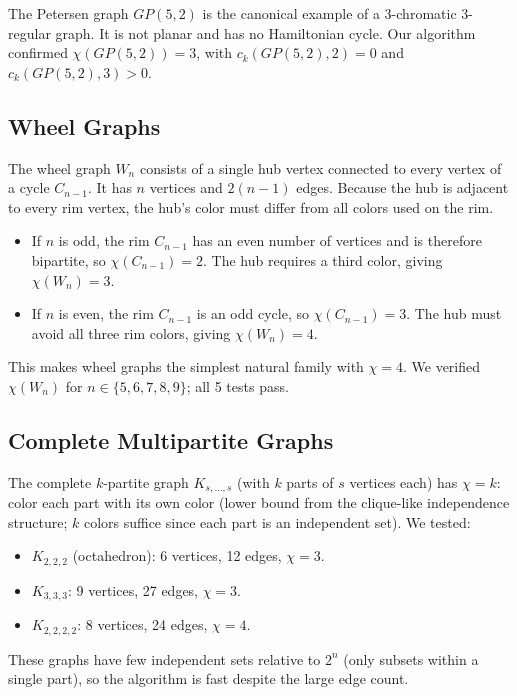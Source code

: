 \documentclass[11pt]{article}
\begin{document}
The Petersen graph $GP(5,2)$ is the canonical example of a 3-chromatic
3-regular graph.  It is not planar and has no Hamiltonian cycle.  Our algorithm
confirmed $\chi(GP(5,2)) = 3$, with $c_k(GP(5,2), 2) = 0$ and $c_k(GP(5,2),
3) > 0$.

\subsection{Wheel Graphs}

The wheel graph $W_n$ consists of a single hub vertex connected to every vertex
of a cycle $C_{n-1}$.  It has $n$ vertices and $2(n-1)$ edges.  Because the
hub is adjacent to every rim vertex, the hub's color must differ from all colors
used on the rim.

\begin{itemize}
  \item If $n$ is odd, the rim $C_{n-1}$ has an even number of vertices and is
        therefore bipartite, so $\chi(C_{n-1}) = 2$.  The hub requires a third
        color, giving $\chi(W_n) = 3$.
  \item If $n$ is even, the rim $C_{n-1}$ is an odd cycle, so $\chi(C_{n-1})
        = 3$.  The hub must avoid all three rim colors, giving $\chi(W_n) = 4$.
\end{itemize}

This makes wheel graphs the simplest natural family with $\chi = 4$.  We
verified $\chi(W_n)$ for $n \in \{5,6,7,8,9\}$; all 5 tests pass.

\subsection{Complete Multipartite Graphs}

The complete $k$-partite graph $K_{s,\ldots,s}$ (with $k$ parts of $s$
vertices each) has $\chi = k$: color each part with its own color (lower bound
from the clique-like independence structure; $k$ colors suffice since each part
is an independent set).  We tested:

\begin{itemize}
  \item $K_{2,2,2}$ (octahedron): 6 vertices, 12 edges, $\chi = 3$.
  \item $K_{3,3,3}$: 9 vertices, 27 edges, $\chi = 3$.
  \item $K_{2,2,2,2}$: 8 vertices, 24 edges, $\chi = 4$.
\end{itemize}

These graphs have few independent sets relative to $2^n$ (only subsets within
a single part), so the algorithm is fast despite the large edge count.
\end{document}
